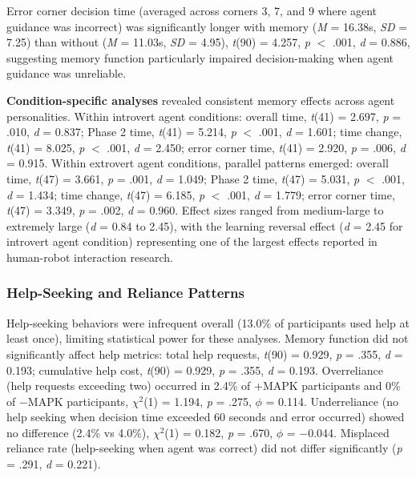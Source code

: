 \documentclass[12pt]{article}
\begin{document}
Error corner decision time (averaged across corners 3, 7, and 9 where agent guidance was incorrect) was significantly longer with memory (\textit{M} = 16.38s, \textit{SD} = 7.25) than without (\textit{M} = 11.03s, \textit{SD} = 4.95), \textit{t}(90) = 4.257, \textit{p} $<$ .001, \textit{d} = 0.886, suggesting memory function particularly impaired decision-making when agent guidance was unreliable.

\textbf{Condition-specific analyses} revealed consistent memory effects across agent personalities. Within introvert agent conditions: overall time, \textit{t}(41) = 2.697, \textit{p} = .010, \textit{d} = 0.837; Phase 2 time, \textit{t}(41) = 5.214, \textit{p} $<$ .001, \textit{d} = 1.601; time change, \textit{t}(41) = 8.025, \textit{p} $<$ .001, \textit{d} = 2.450; error corner time, \textit{t}(41) = 2.920, \textit{p} = .006, \textit{d} = 0.915. Within extrovert agent conditions, parallel patterns emerged: overall time, \textit{t}(47) = 3.661, \textit{p} = .001, \textit{d} = 1.049; Phase 2 time, \textit{t}(47) = 5.031, \textit{p} $<$ .001, \textit{d} = 1.434; time change, \textit{t}(47) = 6.185, \textit{p} $<$ .001, \textit{d} = 1.779; error corner time, \textit{t}(47) = 3.349, \textit{p} = .002, \textit{d} = 0.960. Effect sizes ranged from medium-large to extremely large (\textit{d} = 0.84 to 2.45), with the learning reversal effect (\textit{d} = 2.45 for introvert agent condition) representing one of the largest effects reported in human-robot interaction research.

\subsubsection{Help-Seeking and Reliance Patterns}

Help-seeking behaviors were infrequent overall (13.0\% of participants used help at least once), limiting statistical power for these analyses. Memory function did not significantly affect help metrics: total help requests, \textit{t}(90) = 0.929, \textit{p} = .355, \textit{d} = 0.193; cumulative help cost, \textit{t}(90) = 0.929, \textit{p} = .355, \textit{d} = 0.193. Overreliance (help requests exceeding two) occurred in 2.4\% of +MAPK participants and 0\% of $-$MAPK participants, $\chi^2$(1) = 1.194, \textit{p} = .275, $\phi$ = 0.114. Underreliance (no help seeking when decision time exceeded 60 seconds and error occurred) showed no difference (2.4\% vs 4.0\%), $\chi^2$(1) = 0.182, \textit{p} = .670, $\phi$ = $-$0.044. Misplaced reliance rate (help-seeking when agent was correct) did not differ significantly (\textit{p} = .291, \textit{d} = 0.221).
\end{document}
